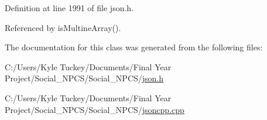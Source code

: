 Definition at line 1991 of file json.\+h.



Referenced by is\+Multine\+Array().



The documentation for this class was generated from the following files\+:\begin{DoxyCompactItemize}
\item 
C\+:/\+Users/\+Kyle Tuckey/\+Documents/\+Final Year Project/\+Social\+\_\+\+N\+P\+C\+S/\+Social\+\_\+\+N\+P\+C\+S/\hyperlink{json_8h}{json.\+h}\item 
C\+:/\+Users/\+Kyle Tuckey/\+Documents/\+Final Year Project/\+Social\+\_\+\+N\+P\+C\+S/\+Social\+\_\+\+N\+P\+C\+S/\hyperlink{jsoncpp_8cpp}{jsoncpp.\+cpp}\end{DoxyCompactItemize}

